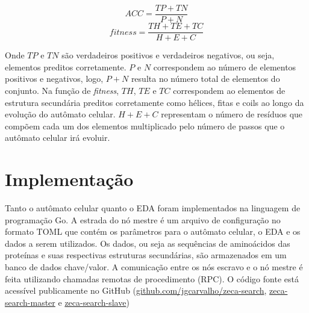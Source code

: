 \begin{equation} \label{eq:fitness}
ACC = \frac{TP + TN}{P + N}
\end{equation}
\begin{equation}
fitness =  \frac{TH + TE + TC}{H + E + C}
\end{equation}

Onde $TP$ e $TN$ são verdadeiros positivos e verdadeiros negativos, ou seja, elementos preditos corretamente. $P$ e $N$ correspondem ao número de elementos positivos e negativos, logo, $P+N$ resulta no número total de elementos do conjunto. Na função de \textit{fitness}, $TH$, $TE$ e $TC$ correspondem ao elementos de estrutura secundária preditos corretamente como hélices, fitas e coils ao longo da evolução do autômato celular. $H+E+C$ representam o número de resíduos que compõem cada um dos elementos multiplicado pelo número de passos que o autômato celular irá evoluir.



\section{Implementação}

Tanto o autômato celular quanto o EDA foram implementados na linguagem de programação Go. A estrada do nó mestre é um arquivo de configuração no formato TOML que contém os parâmetros para o autômato celular, o EDA e os dados a serem utilizados. Os dados, ou seja as sequências de aminoácidos das proteínas e suas respectivas estruturas secundárias, são armazenados em um banco de dados chave/valor. A comunicação entre os nós escravo e o nó mestre é feita utilizando chamadas remotas de procedimento (RPC). O código fonte está acessível publicamente no GitHub (\href{https://github.com/jgcarvalho/zeca-search}{github.com/jgcarvalho/zeca-search}, \href{https://github.com/jgcarvalho/zeca-search-master}{zeca-search-master} e \href{https://github.com/jgcarvalho/zeca-search-slave}{zeca-search-slave})  

